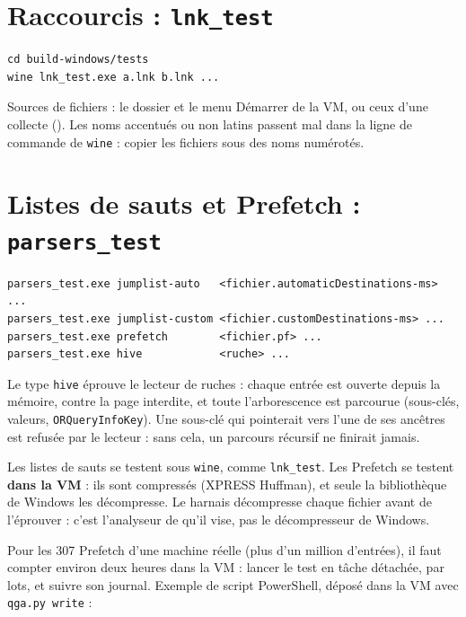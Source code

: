 \documentclass[11pt,a4paper,oneside]{report}
\begin{document}
\section{Raccourcis : \texttt{lnk\_test}}

\begin{lstlisting}
cd build-windows/tests
wine lnk_test.exe a.lnk b.lnk ...
\end{lstlisting}

Sources de fichiers : le dossier  et le menu Démarrer de la VM,
ou ceux d'une collecte (). Les noms accentués ou
non latins passent mal dans la ligne de commande de \texttt{wine} : copier les
fichiers sous des noms numérotés.

\section{Listes de sauts et Prefetch : \texttt{parsers\_test}}\label{sec:parsers}

\begin{lstlisting}
parsers_test.exe jumplist-auto   <fichier.automaticDestinations-ms> ...
parsers_test.exe jumplist-custom <fichier.customDestinations-ms> ...
parsers_test.exe prefetch        <fichier.pf> ...
parsers_test.exe hive            <ruche> ...
\end{lstlisting}

Le type \texttt{hive} éprouve le lecteur de ruches : chaque entrée est ouverte
depuis la mémoire, contre la page interdite, et toute l'arborescence est
parcourue (sous-clés, valeurs, \texttt{ORQueryInfoKey}). Une sous-clé qui
pointerait vers l'une de ses ancêtres est refusée par le lecteur : sans cela,
un parcours récursif ne finirait jamais.

Les listes de sauts se testent sous \texttt{wine}, comme \texttt{lnk\_test}. Les
Prefetch se testent \textbf{dans la VM} : ils sont compressés (XPRESS Huffman),
et seule la bibliothèque  de Windows les décompresse. Le harnais
décompresse chaque fichier avant de l'éprouver : c'est l'analyseur de \wac{}
qu'il vise, pas le décompresseur de Windows.

Pour les 307 Prefetch d'une machine réelle (plus d'un million d'entrées), il
faut compter environ deux heures dans la VM : lancer le test en tâche détachée,
par lots, et suivre son journal. Exemple de script PowerShell, déposé dans la VM
avec \texttt{qga.py write} :
\end{document}
